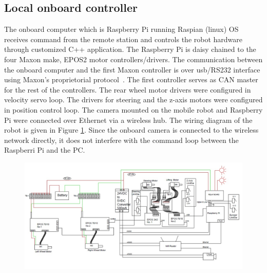 \subsection{Local onboard controller}
The  onboard computer which is Raspberry Pi running Raspian (linux) OS receives  command from the remote station and controls the robot hardware through customized C++ application.
The Raspberry Pi  is daisy chained to the four Maxon make, EPOS2 motor controllers/drivers. The communication between the onboard computer and the first Maxon controller is over usb/RS232 interface using Maxon's proprietorial protocol~\cite{maxonrs232}. The first controller serves as CAN master for the rest of the controllers. The rear wheel motor drivers were configured in velocity servo loop. The drivers for steering and the z-axis motors were configured in position control loop.  The camera mounted on the mobile robot  and Raspberry Pi  were connected over Ethernet via a wireless hub. The wiring diagram of the robot is given in Figure \ref {fig:wiring}. Since the onboard camera is connected to the wireless network directly, it does not interfere with the command loop between the Raspberri Pi and the PC. 
\begin{figure}
	\includegraphics[width=\linewidth,keepaspectratio]{Chapter5/fig/RobotSideWiring}
	\label{fig:wiring} 
\end{figure} 

